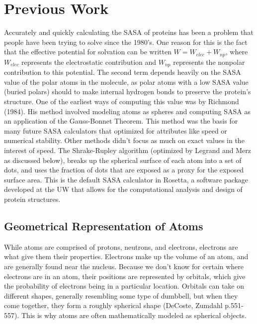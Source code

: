 \documentclass{article}
\begin{document}
\section{Previous Work}
Accurately and quickly calculating the SASA of proteins has been a problem that people have been trying to solve since the 1980's. One reason for this is the fact that the effective potential for solvation can be written $W=W_{elec}+W_{np}$, where $W_{elec}$ represents the electrostatic contribution and $W_{np}$ represents the nonpolar contribution to this potential. The second term depends heavily on the SASA value of the polar atoms in the molecule, as polar atoms with a low SASA value (buried polars) should to make internal hydrogen bonds to preserve the protein's structure. One of the earliest ways of computing this value was by Richmond (1984). His method involved modeling atoms as spheres and computing SASA as an application of the Gauss-Bonnet Theorem. This method was the basis for many future SASA calculators that optimized for attributes like speed or numerical stability. Other methods didn't focus as much on exact values in the interest of speed. The Shrake-Rupley algorithm (optimized by Legrand and Merz as discussed below), breaks up the spherical surface of each atom into a set of dots, and uses the fraction of dots that are exposed as a proxy for the exposed surface area. This is the default SASA calculator in Rosetta, a software package developed at the UW that allows for the computational analysis and design of protein structures. 
\subsection{Geometrical Representation of Atoms}
While atoms are comprised of protons, neutrons, and electrons, electrons are what give them their properties. Electrons make up the volume of an atom, and are generally found near the nucleus. Because we don’t know for certain where electrons are in an atom, their positions are represented by orbitals, which give the probability of electrons being in a particular location. Orbitals can take on different shapes, generally resembling some type of dumbbell, but when they come together, they form a roughly spherical shape (DeCoste, Zumdahl p.551-557). This is why atoms are often mathematically modeled as spherical objects.
\end{document}
